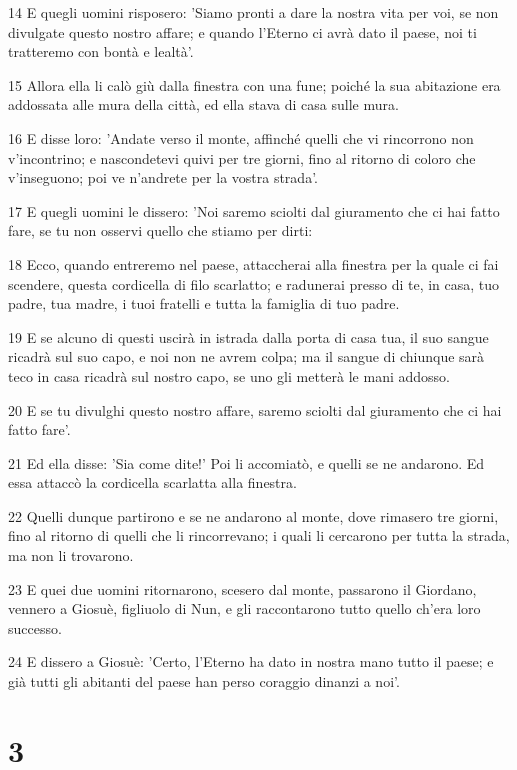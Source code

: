 \par 14 E quegli uomini risposero: 'Siamo pronti a dare la nostra vita per voi, se non divulgate questo nostro affare; e quando l'Eterno ci avrà dato il paese, noi ti tratteremo con bontà e lealtà'.
\par 15 Allora ella li calò giù dalla finestra con una fune; poiché la sua abitazione era addossata alle mura della città, ed ella stava di casa sulle mura.
\par 16 E disse loro: 'Andate verso il monte, affinché quelli che vi rincorrono non v'incontrino; e nascondetevi quivi per tre giorni, fino al ritorno di coloro che v'inseguono; poi ve n'andrete per la vostra strada'.
\par 17 E quegli uomini le dissero: 'Noi saremo sciolti dal giuramento che ci hai fatto fare, se tu non osservi quello che stiamo per dirti:
\par 18 Ecco, quando entreremo nel paese, attaccherai alla finestra per la quale ci fai scendere, questa cordicella di filo scarlatto; e radunerai presso di te, in casa, tuo padre, tua madre, i tuoi fratelli e tutta la famiglia di tuo padre.
\par 19 E se alcuno di questi uscirà in istrada dalla porta di casa tua, il suo sangue ricadrà sul suo capo, e noi non ne avrem colpa; ma il sangue di chiunque sarà teco in casa ricadrà sul nostro capo, se uno gli metterà le mani addosso.
\par 20 E se tu divulghi questo nostro affare, saremo sciolti dal giuramento che ci hai fatto fare'.
\par 21 Ed ella disse: 'Sia come dite!' Poi li accomiatò, e quelli se ne andarono. Ed essa attaccò la cordicella scarlatta alla finestra.
\par 22 Quelli dunque partirono e se ne andarono al monte, dove rimasero tre giorni, fino al ritorno di quelli che li rincorrevano; i quali li cercarono per tutta la strada, ma non li trovarono.
\par 23 E quei due uomini ritornarono, scesero dal monte, passarono il Giordano, vennero a Giosuè, figliuolo di Nun, e gli raccontarono tutto quello ch'era loro successo.
\par 24 E dissero a Giosuè: 'Certo, l'Eterno ha dato in nostra mano tutto il paese; e già tutti gli abitanti del paese han perso coraggio dinanzi a noi'.

\chapter{3}

